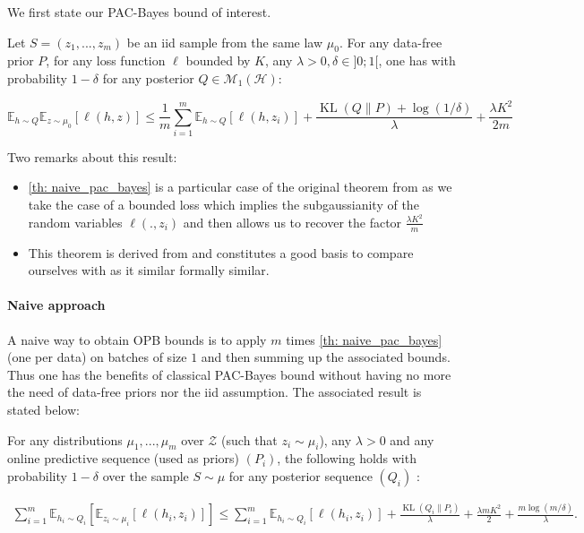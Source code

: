 We first state our PAC-Bayes bound of interest.

\begin{theorem}
  \label{th: naive_pac_bayes}
  Let $S=(z_1,...,z_m)$ be an iid sample from the same law $\mu_0$.
  For any data-free prior $P$, for any loss function $\ell$ bounded by $K$, any $\lambda>0,\delta\in ]0;1[$, one has with probability $1-\delta$ for any posterior $Q\in\mathcal{M}_1(\mathcal{H})$:

  \[ \mathbb{E}_{h\sim Q}\mathbb{E}_{z\sim \mu_0}[\ell(h,z)] \leq \frac{1}{m} \sum_{i=1}^m \mathbb{E}_{h\sim Q}[\ell(h,z_i)] + \frac{\operatorname{KL}(Q\| P) + \log(1/\delta)}{\lambda} + \frac{\lambda K^2}{2m} \]
\end{theorem}

\begin{remark} Two remarks about this result:


  \begin{itemize}
    \item \cref{th: naive_pac_bayes} is a particular case of the original theorem from \cite{alquier2016properties} as we take the case of a bounded loss which implies the subgaussianity of the random variables $\ell(.,z_i)$ and then allows us to recover the factor $\frac{\lambda K^2}{m}$
    \item This theorem is derived from \cite{catoni2007pac} and constitutes a good basis to compare ourselves with as it similar formally similar.
  \end{itemize}
\end{remark}


\paragraph{Naive approach} A naive way to obtain OPB bounds is to apply $m$ times \cref{th: naive_pac_bayes} (one per data) on batches of size $1$ and then summing up the associated bounds. Thus one has the benefits of classical PAC-Bayes bound without having no more the need of data-free priors nor the iid assumption. The associated result is stated below:

\begin{theorem}
  \label{th: naive_approach}
  For any distributions $\mu_1,...,\mu_m$ over $\mathcal{Z}$ (such that $z_i\sim \mu_i$), any $\lambda>0$ and any online predictive sequence (used as priors) $(P_i)$, the following holds with probability $1-\delta$ over the sample $S\sim\mu$ for any posterior sequence $(Q_i)$ :


  \begin{align*}
    \sum_{i=1}^m \mathbb{E}_{h_i\sim Q_{i}}\left[ \mathbb{E}_{z_i\sim \mu_i}[\ell(h_i,z_i)]    \right] \leq \sum_{i=1}^m \mathbb{E}_{h_i\sim Q_{i}}\left[ \ell(h_i,z_i) \right] +
    \frac{\operatorname{KL}(Q_{i}\| P_i)}{\lambda} + \frac{\lambda m K^2}{2} + \frac{m\log(m/\delta)}{\lambda}.
  \end{align*}
\end{theorem}

